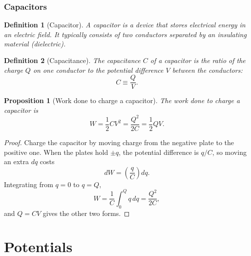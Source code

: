 \documentclass{article}
\newtheorem{definition}{Definition}
\newtheorem{proposition}{Proposition}
\begin{document}
\subsubsection{Capacitors}
\begin{definition}[Capacitor]
    A capacitor is a device that stores electrical energy in an electric field. It typically consists of two conductors separated by an insulating material (dielectric).
\end{definition}
\begin{definition}[Capacitance]
    The capacitance $C$ of a capacitor is the ratio of the charge $Q$ on one conductor to the potential difference $V$ between the conductors:
    \begin{equation}
        C \equiv \frac{Q}{V}.
    \end{equation}
\end{definition}
\begin{proposition}[Work done to charge a capacitor]
    The work done to charge a capacitor is
    \begin{equation}
        W = \frac{1}{2}CV^2 = \frac{Q^2}{2C} = \frac{1}{2}QV.
    \end{equation}
\end{proposition}
\begin{proof}
    Charge the capacitor by moving charge from the negative plate to the positive one. When the plates hold $\pm q$, the potential difference is $q/C$, so moving an extra $dq$ costs
    \[dW = \left(\frac{q}{C}\right)dq.\]
    Integrating from $q = 0$ to $q = Q$,
    \[W = \frac{1}{C}\int_0^Q q\,dq = \frac{Q^2}{2C},\]
    and $Q = CV$ gives the other two forms.
\end{proof}

\section{Potentials}
\end{document}
